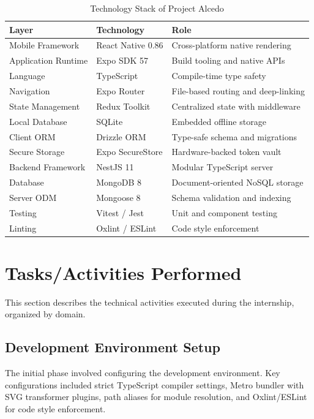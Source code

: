 \begin{table}[htbp]
    \centering
    \caption{Technology Stack of Project Alcedo}
    \label{tab:tech-stack}
    \begin{tabular}{|p{1.5in}|p{1.3in}|p{2.6in}|}
        \hline
        \textbf{Layer} & \textbf{Technology} & \textbf{Role} \\
        \hline
        Mobile Framework & React Native 0.86 & Cross-platform native rendering \\
        Application Runtime & Expo SDK 57 & Build tooling and native APIs \\
        Language & TypeScript & Compile-time type safety \\
        Navigation & Expo Router & File-based routing and deep-linking \\
        State Management & Redux Toolkit & Centralized state with middleware \\
        Local Database & SQLite & Embedded offline storage \\
        Client ORM & Drizzle ORM & Type-safe schema and migrations \\
        Secure Storage & Expo SecureStore & Hardware-backed token vault \\
        Backend Framework & NestJS 11 & Modular TypeScript server \\
        Database & MongoDB 8 & Document-oriented NoSQL storage \\
        Server ODM & Mongoose 8 & Schema validation and indexing \\
        Testing & Vitest / Jest & Unit and component testing \\
        Linting & Oxlint / ESLint & Code style enforcement \\
        \hline
    \end{tabular}
\end{table}

\section{Tasks/Activities Performed}
This section describes the technical activities executed during the internship, organized by domain.

\subsection{Development Environment Setup}
The initial phase involved configuring the development environment. Key configurations included strict TypeScript compiler settings, Metro bundler with SVG transformer plugins, path aliases for module resolution, and Oxlint/ESLint for code style enforcement.


